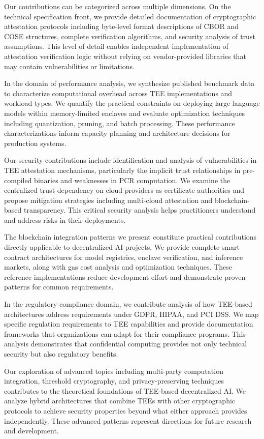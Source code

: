 Our contributions can be categorized across multiple dimensions. On the technical specification front, we provide detailed documentation of cryptographic attestation protocols including byte-level format descriptions of CBOR and COSE structures, complete verification algorithms, and security analysis of trust assumptions. This level of detail enables independent implementation of attestation verification logic without relying on vendor-provided libraries that may contain vulnerabilities or limitations.

In the domain of performance analysis, we synthesize published benchmark data to characterize computational overhead across TEE implementations and workload types. We quantify the practical constraints on deploying large language models within memory-limited enclaves and evaluate optimization techniques including quantization, pruning, and batch processing. These performance characterizations inform capacity planning and architecture decisions for production systems.

Our security contributions include identification and analysis of vulnerabilities in TEE attestation mechanisms, particularly the implicit trust relationships in pre-compiled binaries and weaknesses in PCR computation. We examine the centralized trust dependency on cloud providers as certificate authorities and propose mitigation strategies including multi-cloud attestation and blockchain-based transparency. This critical security analysis helps practitioners understand and address risks in their deployments.

The blockchain integration patterns we present constitute practical contributions directly applicable to decentralized AI projects. We provide complete smart contract architectures for model registries, enclave verification, and inference markets, along with gas cost analysis and optimization techniques. These reference implementations reduce development effort and demonstrate proven patterns for common requirements.

In the regulatory compliance domain, we contribute analysis of how TEE-based architectures address requirements under GDPR, HIPAA, and PCI DSS. We map specific regulation requirements to TEE capabilities and provide documentation frameworks that organizations can adapt for their compliance programs. This analysis demonstrates that confidential computing provides not only technical security but also regulatory benefits.

Our exploration of advanced topics including multi-party computation integration, threshold cryptography, and privacy-preserving techniques contributes to the theoretical foundations of TEE-based decentralized AI. We analyze hybrid architectures that combine TEEs with other cryptographic protocols to achieve security properties beyond what either approach provides independently. These advanced patterns represent directions for future research and development.

